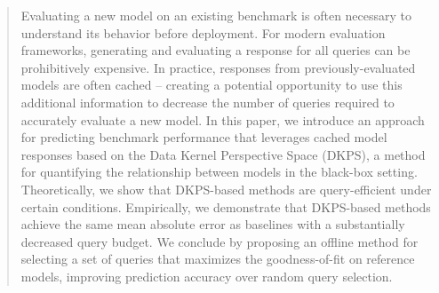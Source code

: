 
\begin{abstract}
Evaluating a new model on an existing benchmark is often necessary to understand its behavior before deployment.
For modern evaluation frameworks, generating and evaluating a response for all  queries can be prohibitively expensive.
In practice, responses from previously-evaluated models are often cached -- creating a potential opportunity to use this additional information to decrease the number of queries required to accurately evaluate a new model.
In this paper, we introduce an approach for predicting benchmark performance that leverages cached model responses based on the Data Kernel Perspective Space (DKPS), a method for quantifying the relationship between models in the black-box setting.
Theoretically, we show that DKPS-based methods are query-efficient under certain conditions.
Empirically, we demonstrate that DKPS-based methods achieve the same mean absolute error as baselines with a substantially decreased query budget.
We conclude by proposing an offline method for selecting a set of queries that maximizes the goodness-of-fit on reference models, improving prediction accuracy over random query selection.
\end{abstract}

